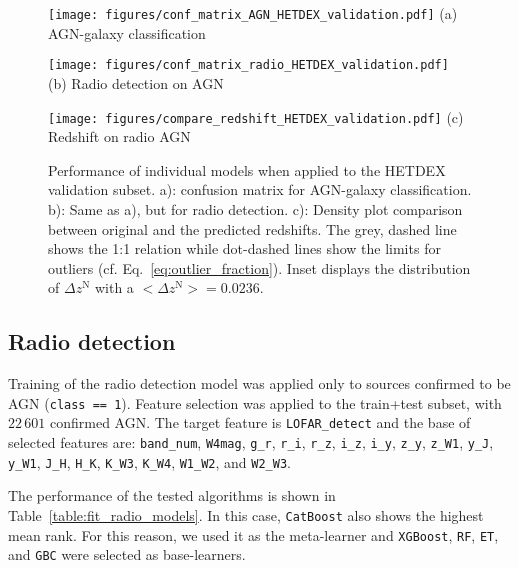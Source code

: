 \documentclass{aa}
\begin{document}
\begin{figure}
  \centering
  \begin{minipage}{0.49\columnwidth}
    \centering
    \texttt{[image: figures/conf\_matrix\_AGN\_HETDEX\_validation.pdf]}\hfill\break
    {(a) AGN-galaxy classification}
  \end{minipage}%
  \begin{minipage}{0.49\columnwidth}
    \centering
    \texttt{[image: figures/conf\_matrix\_radio\_HETDEX\_validation.pdf]}\hfill\break
    {(b) Radio detection on AGN}
  \end{minipage}\hfill\break%
  \begin{minipage}{0.70\columnwidth}
    \centering
    \texttt{[image: figures/compare\_redshift\_HETDEX\_validation.pdf]}\hfill\break
    {(c) Redshift on radio AGN}
  \end{minipage}%
  \caption{Performance of individual models when applied to the HETDEX validation subset. a): confusion matrix for AGN-galaxy classification. 
  b): Same as a), but for radio detection. c): Density plot comparison between original and the predicted redshifts. 
  The grey, dashed line shows the 1:1 relation while dot-dashed lines show the limits for outliers (cf. Eq.~\ref{eq:outlier_fraction}). Inset displays the distribution of $\Delta z^{\mathrm{N}}$ with a ${{<}\Delta z^{\mathrm{N}}{>} = 0.0236}$.}
  \label{fig:results_models_validation}
\end{figure}

\subsection{Radio detection}\label{sec:results_radio}

Training of the radio detection model was applied only to sources confirmed to be AGN (\texttt{class == 1}).
Feature selection was applied to the train+test subset, with $22\,601$ confirmed AGN. 
The target feature is \verb|LOFAR_detect| and the base of selected features are:  \verb|band_num|, \verb|W4mag|, \verb|g_r|, \verb|r_i|, \verb|r_z|, \verb|i_z|, \verb|i_y|, \verb|z_y|, \verb|z_W1|, \verb|y_J|, \verb|y_W1|, \verb|J_H|, \verb|H_K|, \verb|K_W3|, \verb|K_W4|, \verb|W1_W2|, and \verb|W2_W3|.

The performance of the tested algorithms is shown in Table~\ref{table:fit_radio_models}. 
In this case, \verb|CatBoost| also shows the highest mean rank. For this reason, we used it as the meta-learner and \verb|XGBoost|, \verb|RF|, \verb|ET|, and \verb|GBC| were selected as base-learners.
\end{document}
